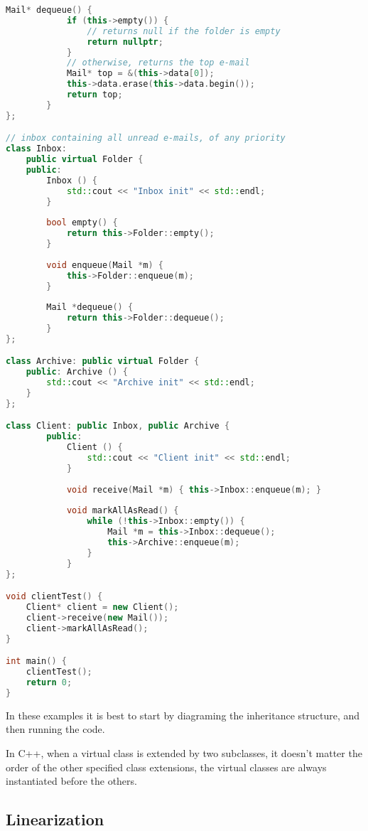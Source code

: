 \documentclass{article}
\begin{document}
\begin{example}
\begin{lstlisting}[language=C++, escapechar=|]
        Mail* dequeue() {
            if (this->empty()) {
                // returns null if the folder is empty
                return nullptr;
            }
            // otherwise, returns the top e-mail
            Mail* top = &(this->data[0]);
            this->data.erase(this->data.begin());
            return top;
        }
};

// inbox containing all unread e-mails, of any priority
class Inbox:
    public virtual Folder {
    public:
        Inbox () {
            std::cout << "Inbox init" << std::endl;
        }
    
        bool empty() {
            return this->Folder::empty();
        }
        
        void enqueue(Mail *m) {
            this->Folder::enqueue(m);
        }
        
        Mail *dequeue() {
            return this->Folder::dequeue();
        }
};

class Archive: public virtual Folder {
    public: Archive () {
        std::cout << "Archive init" << std::endl;
    }
};

class Client: public Inbox, public Archive {
        public:
            Client () {
                std::cout << "Client init" << std::endl;
            }
        
            void receive(Mail *m) { this->Inbox::enqueue(m); }
            
            void markAllAsRead() {
                while (!this->Inbox::empty()) {
                    Mail *m = this->Inbox::dequeue();
                    this->Archive::enqueue(m);
                }
            }
};

void clientTest() {
    Client* client = new Client();
    client->receive(new Mail());
    client->markAllAsRead();
}

int main() {
    clientTest();
    return 0;
}
\end{lstlisting}
  In these examples it is best to start by diagraming the inheritance structure, and then running the code.
\end{example}

\begin{remark}
  In C++, when a virtual class is extended by two subclasses, it doesn't matter the order of the other specified class extensions, the virtual classes are always instantiated before the others.
\end{remark}

\subsection{Linearization}
\end{document}
